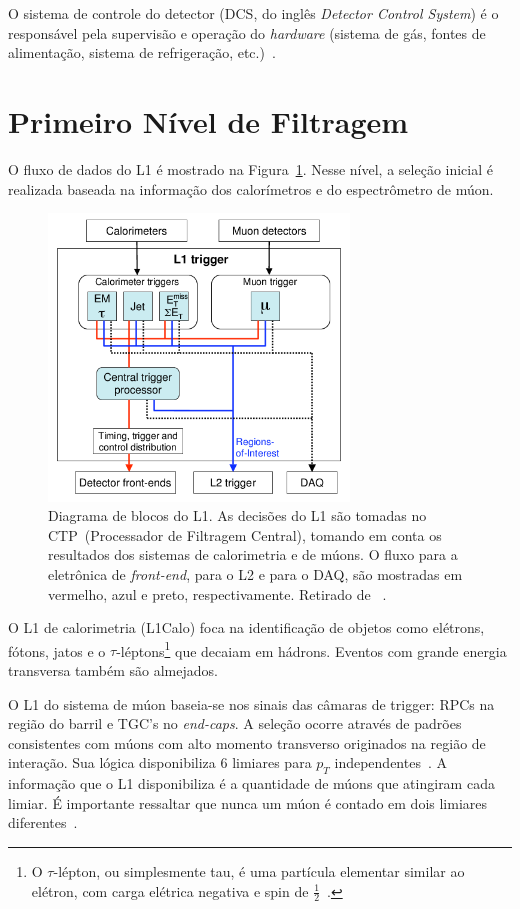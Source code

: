 O sistema de controle do detector (DCS,  do inglês \emph{Detector Control
System}) é o responsável pela supervisão e operação do \emph{hardware} (sistema
de gás, fontes de alimentação, sistema de refrigeração, etc.)~\cite{PPOY2008}.

\section{Primeiro Nível de Filtragem}

O fluxo de dados do L1 é mostrado na Figura~\ref{fig:l1schema}. Nesse nível, a
seleção inicial é realizada baseada na informação dos calorímetros e do
espectrômetro de múon.

\begin{figure}[htpb!]
    \centering
    \includegraphics[width=8cm]{images/l1-schema.png}
    \caption[Diagrama de blocos do L1.]{Diagrama de blocos do L1. As decisões do L1 são tomadas no
    CTP~(Processador de Filtragem Central), tomando em conta os resultados dos
    sistemas de calorimetria e de múons. O fluxo para a eletrônica de
    \emph{front-end}, para o L2 e para o DAQ, são mostradas em vermelho, azul e
    preto, respectivamente. Retirado de ~\cite{ATLAS2008}.}
    \label{fig:l1schema}
\end{figure}

O L1 de calorimetria (L1Calo) foca na identificação de objetos como elétrons,
fótons, jatos e o $\tau$-léptons\footnote{O $\tau$-lépton, ou simplesmente tau, é
uma partícula elementar similar ao elétron, com carga elétrica negativa e spin
de $\frac{1}{2}$~\cite{ATLAS2011TAU}.} que decaiam em hádrons. Eventos com
grande energia transversa também são almejados. 

O L1 do sistema de múon baseia-se nos sinais das câmaras de trigger: RPCs na
região do barril e TGC's no \emph{end-caps}. A seleção ocorre através de
padrões consistentes com múons com alto momento transverso originados na região
de interação. Sua lógica disponibiliza 6 limiares para $p_T$
independentes~\cite{ATLAS2008}. A informação que o L1 disponibiliza é a
quantidade de múons que atingiram cada limiar. É importante ressaltar que nunca
um múon é contado em dois limiares diferentes~\cite{ATLAS2008}.


